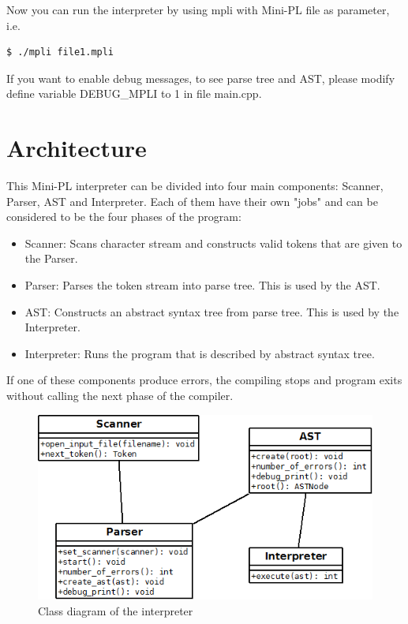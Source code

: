 \documentclass[english,11pt,twoside,a4paper]{article}
\begin{document}
Now you can run the interpreter by using mpli with Mini-PL file as parameter, i.e.

\begin{lstlisting}[language=bash]
  $ ./mpli file1.mpli
\end{lstlisting}

If you want to enable debug messages, to see parse tree and AST, please modify define variable DEBUG\_MPLI to 1 in file main.cpp.

\section{Architecture}

This Mini-PL interpreter can be divided into four main components: Scanner, Parser, AST and Interpreter. Each of them have their own "jobs" and can be considered to be the four phases of the program:

\begin{itemize}
	\item Scanner: Scans character stream and constructs valid tokens that are given to the Parser.
	\item Parser: Parses the token stream into parse tree. This is used by the AST.
	\item AST: Constructs an abstract syntax tree from parse tree. This is used by the Interpreter.
	\item Interpreter: Runs the program that is described by abstract syntax tree.
\end{itemize}

If one of these components produce errors, the compiling stops and program exits without calling the next phase of the compiler.

\begin{figure}
	\begin{center}
		\includegraphics[scale=0.7]{class_diagram.png}
		\caption{Class diagram of the interpreter}
	\end{center}
	\label{class_diagram1}
\end{figure}
\end{document}
